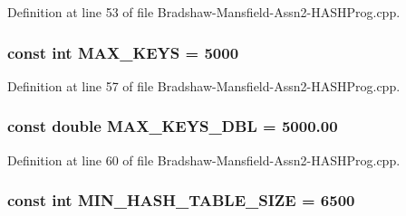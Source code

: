 Definition at line 53 of file Bradshaw-\/Mansfield-\/Assn2-\/HASHProg.cpp.

\hypertarget{_bradshaw-_mansfield-_assn2-_h_a_s_h_prog_8cpp_ad2624222b2a41e40f795baff70c1d20c}{
\subsubsection[{MAX\_\-KEYS}]{\setlength{\rightskip}{0pt plus 5cm}const int {\bf MAX\_\-KEYS} = 5000}}
\label{_bradshaw-_mansfield-_assn2-_h_a_s_h_prog_8cpp_ad2624222b2a41e40f795baff70c1d20c}


Definition at line 57 of file Bradshaw-\/Mansfield-\/Assn2-\/HASHProg.cpp.

\hypertarget{_bradshaw-_mansfield-_assn2-_h_a_s_h_prog_8cpp_a3a0ca86f28ff2c4d31143f5f3d6ca40a}{
\subsubsection[{MAX\_\-KEYS\_\-DBL}]{\setlength{\rightskip}{0pt plus 5cm}const double {\bf MAX\_\-KEYS\_\-DBL} = 5000.00}}
\label{_bradshaw-_mansfield-_assn2-_h_a_s_h_prog_8cpp_a3a0ca86f28ff2c4d31143f5f3d6ca40a}


Definition at line 60 of file Bradshaw-\/Mansfield-\/Assn2-\/HASHProg.cpp.

\hypertarget{_bradshaw-_mansfield-_assn2-_h_a_s_h_prog_8cpp_a92e00f871716652e494af2741a4794bd}{
\subsubsection[{MIN\_\-HASH\_\-TABLE\_\-SIZE}]{\setlength{\rightskip}{0pt plus 5cm}const int {\bf MIN\_\-HASH\_\-TABLE\_\-SIZE} = 6500}}
\label{_bradshaw-_mansfield-_assn2-_h_a_s_h_prog_8cpp_a92e00f871716652e494af2741a4794bd}


